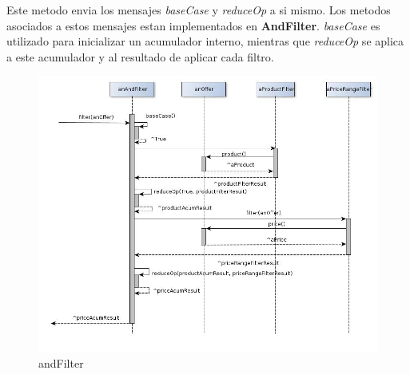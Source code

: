\documentclass[10pt, a4paper]{article}
\begin{document}
Este metodo envia los mensajes \emph{baseCase} y \emph{reduceOp} a si mismo. Los metodos asociados a estos mensajes estan implementados en \textbf{AndFilter}. \emph{baseCase} es utilizado para inicializar un acumulador interno, mientras que \emph{reduceOp} se aplica a este acumulador y al resultado de aplicar cada filtro.
\begin{figure}[H]
\centering
\includegraphics[scale=0.55]{graphics/andFilter_sequence.jpg}
\caption{andFilter}
\end{figure}
\end{document}
